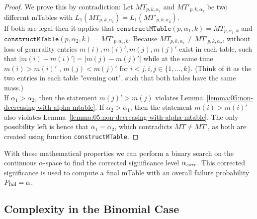 \begin{proof}
	\label{proof:05:mtable-mass-injection}
	We prove this by contradiction: Let $MT_{p,k,\alpha_1}$ and $MT'_{p,k, \alpha_2}$ be two different mTables with $L_1(MT_{p,k,\alpha_1 }) = L_1(MT'_{p,k,\alpha_2})$.\\
	If both are legal then it applies that $\texttt{constructMTable}(p,\alpha_1 ,k)=MT_{p,\alpha_1 ,k}$
	and \\ $\texttt{constructMTable}(p,\alpha_2 ,k)=MT'_{p,\alpha_2 ,k}$.
	Because $MT_{p,k,\alpha_1} \neq MT'_{p,k,\alpha_2}$, without loss of generality entries $m(i), m(i)' , m(j) , m(j)'$ exist in each table, such that $|m(i) - m(i)'| = |m(j) - m(j)'|$ while at the same time $m(i) > m(i)'$ , $m(j) < m(j)'$ for $i<j, i,j \in \lbrace 1, \ldots , k \rbrace$.
	(Think of it as the two entries in each table "evening out", such that both tables have the same mass.)\\
	If $\alpha_1 > \alpha_2$, then the statement $m(j)' > m(j)$ violates Lemma~\ref{lemma:05:non-decreasing-with-alpha-mtable}.
	If $\alpha_2 > \alpha_1$, then the statement $m(i) > m(i)'$ also violates Lemma~\ref{lemma:05:non-decreasing-with-alpha-mtable}.
	The only possibility left is hence that $\alpha_1 = \alpha_2$, which contradicts $MT \neq MT'$, as both are created using function \texttt{constructMTable}.
\end{proof}
%
With these mathematical properties we can perform a binary search on the continuous $\alpha$-space to find the corrected significance level $\alpha_\textit{corr}$.
%
This corrected significance is used to compute a final mTable with an overall failure probability $P_{\operatorname{fail}} = \alpha$.


\subsection{Complexity in the Binomial Case} 
\begin{table}[t!]
	\caption{Time complexity for all algorithms for one protected group without pre-computed results.\label{tbl:time-space-binom}}
	\vspace{-4mm}
\end{table}

